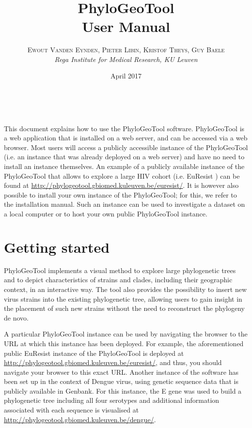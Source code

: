 \documentclass[a4paper, 11pt]{article} %
\title{\textbf{PhyloGeoTool}\\ %
User Manual} %
\author{\textsc{Ewout Vanden Eynden, Pieter Libin, Kristof Theys, Guy Baele} %
\\{\textit{Rega Institute for Medical Research, KU Leuven}}} %
\date{April 2017} %
\makeatletter
\renewcommand{\maketitle}{ %
\begin{flushright} %
{\LARGE\@title} %

\vspace{50pt} %

{\large\@author} %
\\\@date %

\vspace{40pt} %
\end{flushright}
}
\makeatother
\begin{document}
\maketitle %


\vspace{30pt} %

\tableofcontents
\newpage

This document explains how to use the PhyloGeoTool software. 
PhyloGeoTool is a web application that is installed on a web server, and can be accessed via a web browser. 
Most users will access a publicly accessible instance of the PhyloGeoTool (i.e. an instance that was already deployed on a web server) and have no need to install an instance themselves. 
An example of a publicly available instance of the PhyloGeoTool that allows to explore a large HIV cohort (i.e. EuResist \cite{Zazzi2012}) can be found at \url{http://phylogeotool.gbiomed.kuleuven.be/euresist/}.
It is however also possible to install your own instance of the PhyloGeoTool; for this, we refer to the installation manual. %
Such an instance can be used to investigate a dataset on a local computer or to host your own public PhyloGeoTool instance.


\section{Getting started}

PhyloGeoTool implements a visual method to explore large phylogenetic trees and to depict characteristics of strains and clades, including their geographic context, in an interactive way.
The tool also provides the possibility to insert new virus strains into the existing phylogenetic tree, allowing users to gain insight in the placement of such new strains without the need to reconstruct the phylogeny de novo.

A particular PhyloGeoTool instance can be used by navigating the browser to the URL at which this instance has been deployed. 
For example, the aforementioned public EuResist instance of the PhyloGeoTool is deployed at \url{http://phylogeotool.gbiomed.kuleuven.be/euresist/}, and thus, you should navigate your browser to this exact URL. 
Another instance of the software has been set up in the context of Dengue virus, using genetic sequence data that is publicly available in Genbank. 
For this instance, the E gene was used to build a phylogenetic tree including all four serotypes and additional information associated with each sequence is visualised at \url{http://phylogeotool.gbiomed.kuleuven.be/dengue/}.  
\end{document}
